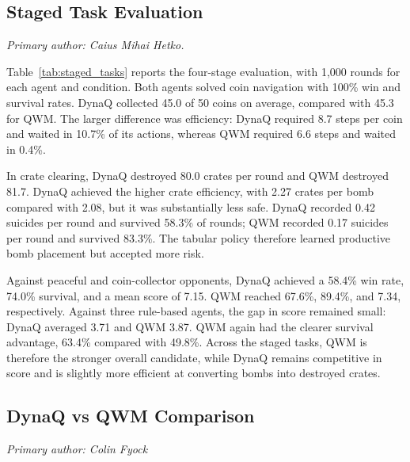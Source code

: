 \documentclass[article, 10pt]{IEEEtran}
\begin{document}
\subsection{Staged Task Evaluation}\label{sec:staged_results}

\textit{Primary author: Caius Mihai Hetko.}

Table~\ref{tab:staged_tasks} reports the four-stage evaluation, with 1,000 rounds for each agent and condition. Both agents solved coin navigation with 100\% win and survival rates. DynaQ collected 45.0 of 50 coins on average, compared with 45.3 for QWM. The larger difference was efficiency: DynaQ required 8.7 steps per coin and waited in 10.7\% of its actions, whereas QWM required 6.6 steps and waited in 0.4\%.

In crate clearing, DynaQ destroyed 80.0 crates per round and QWM destroyed 81.7. DynaQ achieved the higher crate efficiency, with 2.27 crates per bomb compared with 2.08, but it was substantially less safe. DynaQ recorded 0.42 suicides per round and survived 58.3\% of rounds; QWM recorded 0.17 suicides per round and survived 83.3\%. The tabular policy therefore learned productive bomb placement but accepted more risk.

Against peaceful and coin-collector opponents, DynaQ achieved a 58.4\% win rate, 74.0\% survival, and a mean score of 7.15. QWM reached 67.6\%, 89.4\%, and 7.34, respectively. Against three rule-based agents, the gap in score remained small: DynaQ averaged 3.71 and QWM 3.87. QWM again had the clearer survival advantage, 63.4\% compared with 49.8\%. Across the staged tasks, QWM is therefore the stronger overall candidate, while DynaQ remains competitive in score and is slightly more efficient at converting bombs into destroyed crates.

\subsection{DynaQ vs QWM Comparison}

\textit{Primary author: Colin Fyock}
\end{document}
